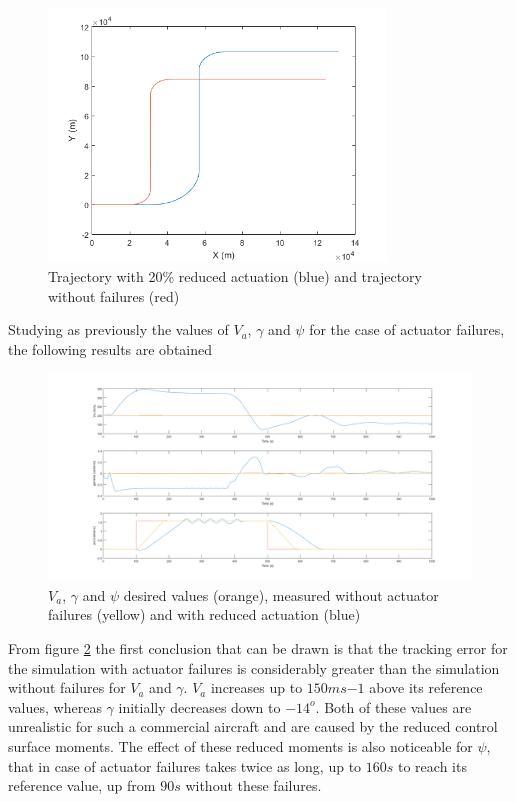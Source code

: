 \begin{figure}[H]
\centering
\includegraphics[width=0.8\textwidth]{Figures/Results/reduced_act.png}
\caption[Trajectory with reduced actuation]{Trajectory with 20\% reduced actuation (blue) and trajectory without failures (red)}
\label{fig:reduced_act}
\end{figure}

Studying as previously the values of $V_a$, $\gamma$ and $\psi$ for the case of actuator failures, the following results are obtained 

\begin{figure}[h]
\centering
\includegraphics[width=1.1\textwidth]{Figures/Results/ref_act_failure.png}
\caption[$V_a$, $\gamma$ and $\psi$ measured and desired values on actuation failure]{$V_a$, $\gamma$ and $\psi$ desired  values (orange), measured without actuator failures (yellow) and with reduced actuation (blue)}
\label{fig:ref_act_fail}
\end{figure}

From figure \ref{fig:ref_act_fail} the first conclusion that can be drawn is that the tracking error for the simulation with actuator failures is considerably greater than the simulation without failures for $V_a$ and $\gamma$. $V_a$ increases up to $150ms{-1}$ above its reference values, whereas $\gamma$ initially decreases down to $-14^o$. Both of these values are unrealistic for such a commercial aircraft and are caused by the reduced control surface moments. The effect of these reduced moments is also noticeable for $\psi$, that in case of actuator failures takes twice as long, up to $160s$ to reach its reference value, up from $90s$ without these failures.

